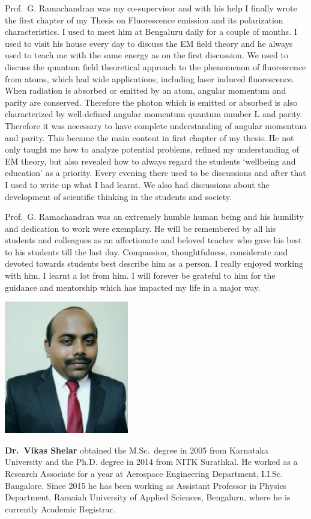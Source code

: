 Prof.\ G. Ramachandran was my co-supervisor and with his help I finally wrote the first chapter of my Thesis on Fluorescence emission and its polarization characteristics. I used to meet him at Bengaluru daily for a couple of months. I used to visit his house every day to discuss the EM field theory and he always used to teach me  with the same energy as on the first discussion. We used to discuss the quantum field theoretical approach to the phenomenon of fluorescence from atoms, which had wide applications, including laser induced fluorescence. When radiation is absorbed or emitted by an atom, angular momentum and parity are conserved. Therefore the photon which is emitted or absorbed is also characterized by well-defined angular momentum quantum number L and parity. Therefore it was necessary to have complete understanding of angular momentum and parity. This became the main content in first chapter of my thesis. He not only taught me how to analyze potential problems, refined my understanding of EM theory, but also revealed how to always regard the students `wellbeing and education' as a priority. Every evening there used to be discussions and after that I used to write up what I had learnt. We also had discussions about the development of scientific thinking in the students and society.

Prof.\ G. Ramachandran was an extremely humble human being and his humility and dedication to work were exemplary. He will be remembered by all his students and colleagues as an affectionate and beloved teacher who gave his best to his students till the last day. Compassion, thoughtfulness, considerate and devoted towards students best describe him as a person. I really enjoyed working with him. I learnt a lot from him. I will forever be grateful to him for the guidance and mentorship which has impacted my life in a major way.
\vskip 1cm

\centerline{\includegraphics[scale=2]{authorsphotos/Dr_Vikas_Shelar.eps}}
\medskip

\noindent
\textbf{Dr.\ Vikas Shelar} obtained the M.Sc.\ degree in 2005 from Karnataka University and the Ph.D. degree in 2014 from NITK Surathkal.  He worked as a Research Associate for a year at Aerospace Engineering Department, I.I.Sc. Bangalore. Since 2015 he has been working as Assistant Professor in Physics Department, Ramaiah University of Applied Sciences, Bengaluru, where he is currently Academic Registrar.
